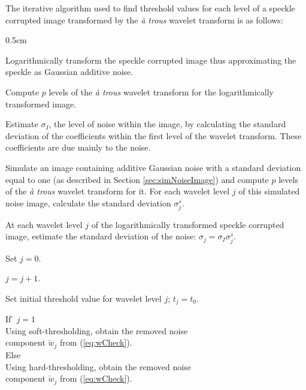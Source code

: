 \documentclass[twocolumn]{article}
\begin{document}
The iterative algorithm used to find threshold values for each level of a speckle corrupted image
transformed by the \emph{\`a trous} wavelet transform is as follows:
\begin{list}{.}{ 
\setlength{\labelwidth} {0.5cm} \rm }
	\item Logarithmically transform the speckle corrupted image thus
	approximating the speckle as Gaussian additive noise.
		
	\item Compute $p$ levels of the \emph{\`a trous} wavelet transform for the logarithmically
	transformed image. 

	\item Estimate $\sigma_{I}$, the level of noise within the image, by calculating the standard deviation 
	of the coefficients within the
	first level of the wavelet transform. These coefficients are due mainly to the noise.
	
	\item Simulate an image containing additive Gaussian noise with a standard deviation equal to one
	(as described in Section \ref{sec:simNoiseImage})
	and compute $p$ levels of the \emph{\`a trous} wavelet transform for it. 
	For each wavelet level $j$ of this simulated noise image, calculate the standard deviation $\sigma_{j}^{s}$.

	\item At each wavelet level $j$ of the logarithmically transformed speckle corrupted image, 
	estimate the standard deviation of the noise: $\sigma_{j}=\sigma_{I}\sigma_{j}^{s}$. 
	
	\item Set $j=0$.
	
	\item $j=j+1$.
	\label{step:incrementJ}

	\item Set initial threshold value for wavelet level $j$; $t_{j} = t_{0}$. 

	\item 
	\begin{tabbing}
	If \= $j = 1$ \\
	\>Using soft-thresholding, obtain the removed noise \\ 
	\>component $\check{w}_{j}$ from (\ref{eq:wCheck}). \\

	Else \\
	\>Using hard-thresholding, obtain the removed noise \\
	\>component $\check{w}_{j}$ from (\ref{eq:wCheck}). 
	\end{tabbing}
	\label{step:sh_if1}


\end{list}
\end{document}
